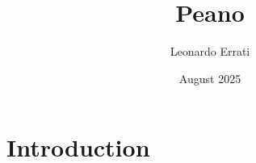 \documentclass{article}
\title{Peano}
\author{Leonardo Errati}
\date{August 2025}
\begin{document}
\maketitle

\section{Introduction}
\end{document}
